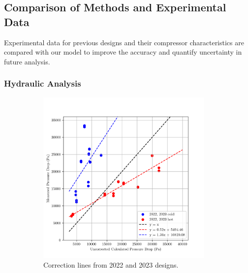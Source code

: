 \documentclass{article}
\begin{document}
\subsection{Comparison of Methods and Experimental Data}

Experimental data for previous designs and their compressor characteristics are compared with our model to improve the accuracy and quantify uncertainty in future analysis.

\subsubsection{Hydraulic Analysis}

\vspace{-0.5cm}

\begin{figure}[H]
  \centering
  \begin{subfigure}{.49\textwidth}
    \centering
    \includegraphics[width=0.95\textwidth]{dp_ucalc_vs_meas.png}
    \caption{Correction lines from 2022 and 2023 designs.}
    \label{fig:uncorrected_pressure_drops}
  \end{subfigure}
  \begin{subfigure}{.49\textwidth}
    \centering

\end{subfigure}
\end{figure}
\end{document}
